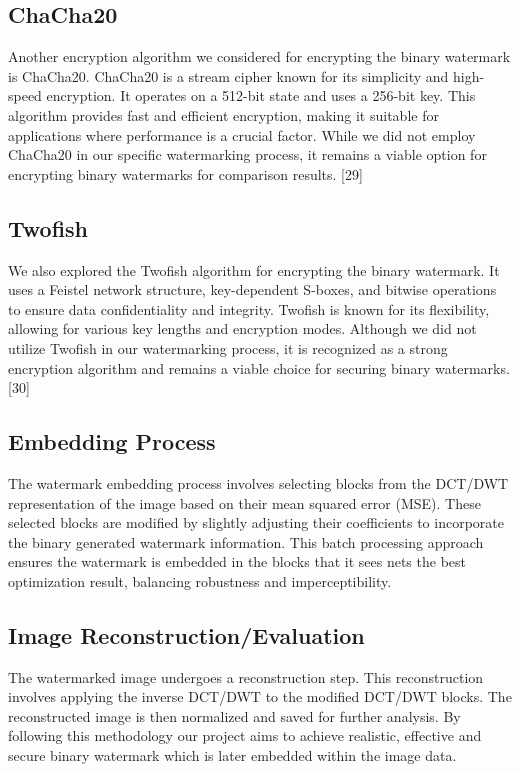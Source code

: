 \documentclass[conference]{IEEEtran}
\begin{document}
\subsection{ChaCha20}
Another encryption algorithm we considered for encrypting the binary watermark is ChaCha20. ChaCha20 is a stream cipher known for its simplicity and high-speed encryption. It operates on a 512-bit state and uses a 256-bit key. 
This algorithm provides fast and efficient encryption, making it suitable for applications where performance is a crucial factor. While we did not employ ChaCha20 in our specific watermarking process, it remains a viable option for encrypting binary watermarks for comparison results. [29]

\subsection{Twofish}
We also explored the Twofish algorithm for encrypting the binary watermark. It uses a Feistel network structure, key-dependent S-boxes, and bitwise operations to ensure data confidentiality and integrity. Twofish is known for its flexibility, allowing for various key lengths and encryption modes. 
Although we did not utilize Twofish in our watermarking process, it is recognized as a strong encryption algorithm and remains a viable choice for securing binary watermarks. [30]

\subsection{Embedding Process}
The watermark embedding process involves selecting blocks from the DCT/DWT representation of the image based on their mean squared error (MSE). These selected blocks are modified by slightly adjusting their coefficients to incorporate the binary generated watermark information. This batch processing approach ensures the watermark is embedded in the blocks that it sees nets the best optimization result, balancing robustness and imperceptibility.

\subsection{Image Reconstruction/Evaluation}
The watermarked image undergoes a reconstruction step. This reconstruction involves applying the inverse DCT/DWT to the modified DCT/DWT blocks. The reconstructed image is then normalized and saved for further analysis. 
By following this methodology our project aims to achieve realistic, effective and secure binary watermark which is later embedded within the image data.
\end{document}
